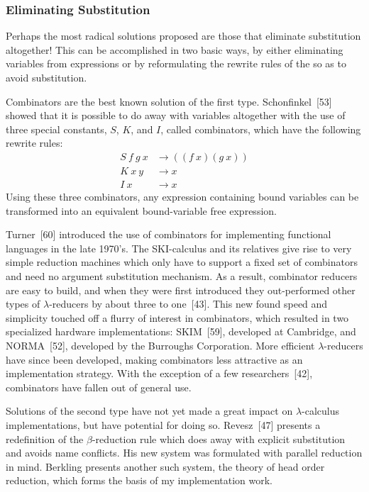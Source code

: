 \subsubsection*{Eliminating Substitution}

Perhaps the most radical solutions proposed are those that eliminate
substitution altogether! This can be accomplished in two basic ways, by either
eliminating variables from expressions or by reformulating the rewrite rules of
the \lambdacalculus{} so as to avoid substitution.

Combinators are the best known solution of the first type. Schonfinkel~[53]
showed that it is possible to do away with variables altogether with the use of
three special constants, \(S\), \(K\), and \(I\), called combinators, which have
the following rewrite rules:
\[
\begin{aligned}
S\ f\ g\ x &\longrightarrow ((f\ x)(g\ x))\\
K\ x\ y &\longrightarrow x\\
I\ x &\longrightarrow x
\end{aligned}
\]
Using these three combinators, any expression containing bound variables can be
transformed into an equivalent bound-variable free expression.

Turner~[60] introduced the use of combinators for implementing functional
languages in the late 1970's. The SKI-calculus and its relatives give rise to
very simple reduction machines which only have to support a fixed set of
combinators and need no argument substitution mechanism. As a result,
combinator reducers are easy to build, and when they were first introduced they
out-performed other types of \(\lambda\)-reducers by about three to one~[43].
This new found speed and simplicity touched off a flurry of interest in
combinators, which resulted in two specialized hardware implementations:
SKIM~[59], developed at Cambridge, and NORMA~[52], developed by the Burroughs
Corporation. More efficient \(\lambda\)-reducers have since been developed,
making combinators less attractive as an implementation strategy. With the
exception of a few researchers~[42], combinators have fallen out of general use.

Solutions of the second type have not yet made a great impact on
\(\lambda\)-calculus implementations, but have potential for doing so.
Revesz~[47] presents a redefinition of the \(\beta\)-reduction rule which does
away with explicit substitution and avoids name conflicts. His new system was
formulated with parallel reduction in mind. Berkling presents another such
system, the theory of head order reduction, which forms the basis of my
implementation work.

